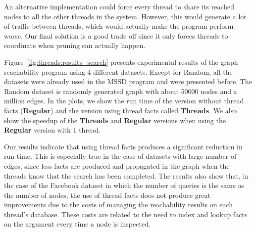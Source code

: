 An alternative implementation could force every thread to share its reached
nodes to all the other threads in the system. However, this would generate a lot
of traffic between threads, which would actually make the program perform worse.
Our final solution is a good trade off since it only forces threads to
coordinate when pruning can actually happen.

Figure~\ref{fig:threads:results_search} presents experimental results of the
graph reachability program using 4 different datasets. Except for Random, all
the datasets were already used in the MSSD program and were presented before.
The Random dataset is randomly generated graph with about 50000 nodes and a
million edges.  In the plots, we show the run time of the version without thread
facts (\textbf{Regular}) and the version using thread facts called
\textbf{Threads}. We also show the speedup of the \textbf{Threads} and
\textbf{Regular} versions when using the \textbf{Regular} version with 1 thread.

Our results indicate that using thread facts produces a significant reduction in
run time. This is especially true in the case of datasets with large number of
edges, since less facts are produced and propagated in the graph when the
threads know that the search has been completed. The results also show that, in
the case of the Facebook dataset in which the number of queries is the same as
the number of nodes, the use of thread facts does not produce great improvements
due to the costs of managing the reachability results on each thread's database.
These costs are related to the need to index and lookup 
facts on the  argument every time a node is inspected.

